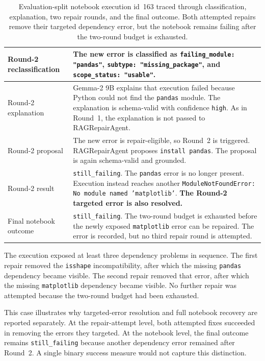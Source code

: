 \begin{table}[htbp]
\begin{tabular}{|p{3.0cm}|p{9.6cm}|}
    Round-2 reclassification &
    The new error is classified as
    \texttt{failing\_module: "pandas"},
    \texttt{subtype: "missing\_package"}, and
    \texttt{scope\_status: "usable"}. \\
    \hline

    Round-2 explanation &
    Gemma-2 9B explains that execution failed because Python could not
    find the \texttt{pandas} module. The explanation is schema-valid
    with confidence \texttt{high}. As in Round~1, the explanation is
    not passed to RAGRepairAgent. \\
    \hline

    Round-2 proposal &
    The new error is repair-eligible, so Round~2 is triggered.
    RAGRepairAgent proposes \texttt{install pandas}. The proposal is
    again schema-valid and grounded. \\
    \hline

    Round-2 result &
    \texttt{still\_failing}. The \texttt{pandas} error is no longer
    present. Execution instead reaches another
    \texttt{ModuleNotFoundError: No module named 'matplotlib'}.
    \textbf{The Round-2 targeted error is also resolved.} \\
    \hline

    Final notebook outcome &
    \texttt{still\_failing}. The two-round budget is exhausted before
    the newly exposed \texttt{matplotlib} error can be repaired. The
    error is recorded, but no third repair round is attempted. \\
    \hline
  \end{tabular}

  \caption{Evaluation-split notebook execution id~163 traced through
  classification, explanation, two repair rounds, and the final outcome.
  Both attempted repairs remove their targeted dependency error, but the
  notebook remains failing after the two-round budget is exhausted.}
  \label{tab:v-case-study}
\end{table}

The execution exposed at least three dependency problems in sequence. The first
repair removed the \texttt{isshape} incompatibility, after which the missing
\texttt{pandas} dependency became visible. The second repair removed that error,
after which the missing \texttt{matplotlib} dependency became visible. No further
repair was attempted because the two-round budget had been exhausted.

This case illustrates why targeted-error resolution and full notebook recovery are
reported separately. At the repair-attempt level, both attempted fixes succeeded
in removing the errors they targeted. At the notebook level, the final outcome
remains \texttt{still\_failing} because another dependency error remained after
Round~2. A single binary success measure would not capture this distinction.

